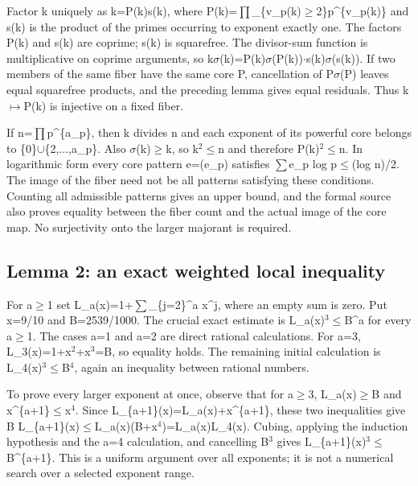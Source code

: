 \documentclass[11pt,a4paper]{article}
\begin{document}
Factor k uniquely as k=P(k)s(k), where P(k)=\ensuremath{\prod}\_\{v\_p(k)\ensuremath{\geq}2\}p\textasciicircum{}\{v\_p(k)\} and s(k) is the product of the primes occurring to exponent exactly one. The factors P(k) and s(k) are coprime; s(k) is squarefree. The divisor-sum function is multiplicative on coprime arguments, so k\ensuremath{\sigma}(k)=P(k)\ensuremath{\sigma}(P(k))\ensuremath{\cdot}s(k)\ensuremath{\sigma}(s(k)). If two members of the same fiber have the same core P, cancellation of P\ensuremath{\sigma}(P) leaves equal squarefree products, and the preceding lemma gives equal residuals. Thus k\ensuremath{\mapsto}P(k) is injective on a fixed fiber.

If n=\ensuremath{\prod}p\textasciicircum{}\{a\_p\}, then k divides n and each exponent of its powerful core belongs to \{0\}\ensuremath{\cup}\{2,...,a\_p\}. Also \ensuremath{\sigma}(k)\ensuremath{\geq}k, so k\ensuremath{^2}\ensuremath{\leq}n and therefore P(k)\ensuremath{^2}\ensuremath{\leq}n. In logarithmic form every core pattern e=(e\_p) satisfies \ensuremath{\sum}e\_p log p\ensuremath{\leq}(log n)/2. The image of the fiber need not be all patterns satisfying these conditions. Counting all admissible patterns gives an upper bound, and the formal source also proves equality between the fiber count and the actual image of the core map. No surjectivity onto the larger majorant is required.

\subsection{Lemma 2: an exact weighted local inequality}
For a\ensuremath{\geq}1 set L\_a(x)=1+\ensuremath{\sum}\_\{j=2\}\textasciicircum{}a x\textasciicircum{}j, where an empty sum is zero. Put x=9/10 and B=2539/1000. The crucial exact estimate is L\_a(x)\ensuremath{^3}\ensuremath{\leq}B\textasciicircum{}a for every a\ensuremath{\geq}1. The cases a=1 and a=2 are direct rational calculations. For a=3, L\_3(x)=1+x\ensuremath{^2}+x\ensuremath{^3}=B, so equality holds. The remaining initial calculation is L\_4(x)\ensuremath{^3}\ensuremath{\leq}B\ensuremath{^4}, again an inequality between rational numbers.

To prove every larger exponent at once, observe that for a\ensuremath{\geq}3, L\_a(x)\ensuremath{\geq}B and x\textasciicircum{}\{a+1\}\ensuremath{\leq}x\ensuremath{^4}. Since L\_\{a+1\}(x)=L\_a(x)+x\textasciicircum{}\{a+1\}, these two inequalities give B L\_\{a+1\}(x)\ensuremath{\leq}L\_a(x)(B+x\ensuremath{^4})=L\_a(x)L\_4(x). Cubing, applying the induction hypothesis and the a=4 calculation, and cancelling B\ensuremath{^3} gives L\_\{a+1\}(x)\ensuremath{^3}\ensuremath{\leq}B\textasciicircum{}\{a+1\}. This is a uniform argument over all exponents; it is not a numerical search over a selected exponent range.
\end{document}
